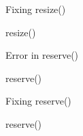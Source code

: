 \begin{frame}[t]{Fixing resize()}
\begin{block}{resize()}

\end{block}
\end{frame}

\begin{frame}[t]{Error in reserve()}
\begin{block}{reserve()}

\end{block}
\end{frame}

\begin{frame}[t]{Fixing reserve()}
\begin{block}{reserve()}

\end{block}
\end{frame}
